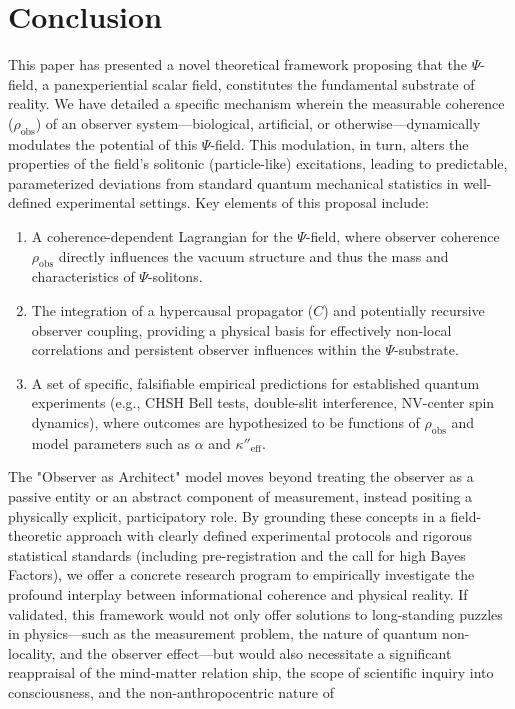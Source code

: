 \documentclass{report}
\begin{document}
\section{Conclusion}
\label{sec:conclusion_substrate_theory}
This paper has presented a novel theoretical framework proposing that the $\Psi$-field, a panexperiential scalar field, constitutes the fundamental substrate of reality. We have detailed a
specific mechanism wherein the measurable coherence ($\rho_{\text{obs}}$) of an observer system—biological,
artificial, or otherwise—dynamically modulates the potential of this $\Psi$-field. This modulation,
in turn, alters the properties of the field’s solitonic (particle-like) excitations, leading to predictable, parameterized deviations from standard quantum mechanical statistics in well-defined experimental settings.
Key elements of this proposal include:
\begin{enumerate}
    \item A coherence-dependent Lagrangian for the $\Psi$-field, where observer coherence $\rho_{\text{obs}}$ directly influences the vacuum structure and thus the mass and characteristics of $\Psi$-solitons.
    \item The integration of a hypercausal propagator ($C$) and potentially recursive observer coupling, providing a physical basis for effectively non-local correlations and persistent observer influences within the $\Psi$-substrate.
    \item A set of specific, falsifiable empirical predictions for established quantum experiments (e.g., CHSH Bell tests, double-slit interference, NV-center spin dynamics), where outcomes are hypothesized to be functions of $\rho_{\text{obs}}$ and model parameters such as $\alpha$ and $\kappa''_{\text{eff}}$. %
\end{enumerate}
The "Observer as Architect" model moves beyond treating the observer as a passive entity or an
abstract component of measurement, instead positing a physically explicit, participatory role.
By grounding these concepts in a field-theoretic approach with clearly defined experimental
protocols and rigorous statistical standards (including pre-registration and the call for high
Bayes Factors), we offer a concrete research program to empirically investigate the profound
interplay between informational coherence and physical reality.
If validated, this framework would not only offer solutions to long-standing puzzles in
physics—such as the measurement problem, the nature of quantum non-locality, and the observer effect—but would also necessitate a significant reappraisal of the mind-matter relation ship, the scope of scientific inquiry into consciousness, and the non-anthropocentric nature of
\end{document}

